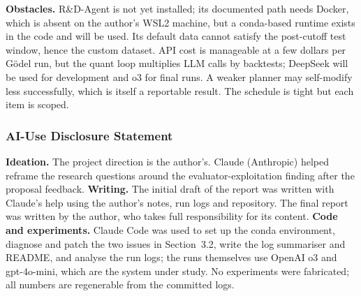 \documentclass{article}
\begin{document}
\textbf{Obstacles.} R\&D-Agent is not yet installed; its documented path needs
Docker, which is absent on the author's WSL2 machine, but a conda-based runtime
exists in the code and will be used. Its default data cannot satisfy the
post-cutoff test window, hence the custom dataset. API cost is manageable at
a few dollars per G\"odel run, but the quant loop multiplies LLM calls by
backtests; DeepSeek will be used for development and o3 for final runs. A
weaker planner may self-modify less successfully, which is itself a reportable
result. The schedule is tight but each item is scoped.

\subsubsection*{AI-Use Disclosure Statement}

\textbf{Ideation.} The project direction is the author's. Claude (Anthropic)
helped reframe the research questions around the evaluator-exploitation
finding after the proposal feedback. \textbf{Writing.} The initial
draft of the report was written with Claude's help using the author's notes,
run logs and repository. The final report was written by the author, who
takes full responsibility for its content.
\textbf{Code and experiments.} Claude Code was used to set up the conda
environment, diagnose and patch the two issues in Section~3.2, write the log
summariser and README, and analyse the run logs; the runs themselves use
OpenAI o3 and gpt-4o-mini, which are the system under study. No experiments
were fabricated; all numbers are regenerable from the committed logs.
\end{document}
